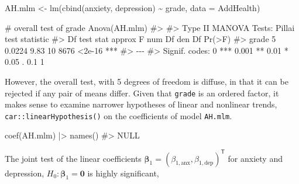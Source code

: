 \documentclass[
  letterpaper,
  10pt,
  krantz2]{krantz}
\makeatletter
\newenvironment{Shaded}{\begin{snugshade}}{\end{snugshade}}
\newcommand{\AttributeTok}[1]{\textcolor[rgb]{0.40,0.45,0.13}{#1}}
\newcommand{\CommentTok}[1]{\textcolor[rgb]{0.37,0.37,0.37}{#1}}
\newcommand{\FunctionTok}[1]{\textcolor[rgb]{0.28,0.35,0.67}{#1}}
\newcommand{\NormalTok}[1]{\textcolor[rgb]{0.00,0.23,0.31}{#1}}
\newcommand{\OtherTok}[1]{\textcolor[rgb]{0.00,0.23,0.31}{#1}}
\newcommand{\SpecialCharTok}[1]{\textcolor[rgb]{0.37,0.37,0.37}{#1}}
\newenvironment{kframe}{%
  \medskip{}
  \setlength{\fboxsep}{.8em}
  \def\at@end@of@kframe{}%
  \ifinner\ifhmode%
  \def\at@end@of@kframe{\end{minipage}}%
  \begin{minipage}{\columnwidth}%
  \fi\fi%
  \def\FrameCommand##1{\hskip\@totalleftmargin \hskip-\fboxsep
  \colorbox{shadecolor}{##1}\hskip-\fboxsep
      \hskip-\linewidth \hskip-\@totalleftmargin \hskip\columnwidth}%
  \MakeFramed {\advance\hsize-\width
    \@totalleftmargin\z@ \linewidth\hsize
    \@setminipage}}%
{\par\unskip\endMakeFramed%
  \at@end@of@kframe}
\renewenvironment{Shaded}{\begin{kframe}}{\end{kframe}}
\makeatother
\begin{document}
\begin{Shaded}
\begin{Highlighting}[]
\NormalTok{AH.mlm }\OtherTok{\textless{}{-}} \FunctionTok{lm}\NormalTok{(}\FunctionTok{cbind}\NormalTok{(anxiety, depression) }\SpecialCharTok{\textasciitilde{}}\NormalTok{ grade, }\AttributeTok{data =}\NormalTok{ AddHealth)}

\CommentTok{\# overall test of \textasciigrave{}grade\textasciigrave{}}
\FunctionTok{Anova}\NormalTok{(AH.mlm)}
\CommentTok{\#\textgreater{} }
\CommentTok{\#\textgreater{} Type II MANOVA Tests: Pillai test statistic}
\CommentTok{\#\textgreater{}       Df test stat approx F num Df den Df Pr(\textgreater{}F)    }
\CommentTok{\#\textgreater{} grade  5    0.0224     9.83     10   8676 \textless{}2e{-}16 ***}
\CommentTok{\#\textgreater{} {-}{-}{-}}
\CommentTok{\#\textgreater{} Signif. codes:  0 \textquotesingle{}***\textquotesingle{} 0.001 \textquotesingle{}**\textquotesingle{} 0.01 \textquotesingle{}*\textquotesingle{} 0.05 \textquotesingle{}.\textquotesingle{} 0.1 \textquotesingle{} \textquotesingle{} 1}
\end{Highlighting}
\end{Shaded}

However, the overall test, with 5 degrees of freedom is diffuse, in that
it can be rejected if any pair of means differ. Given that
\texttt{grade} is an ordered factor, it makes sense to examine narrower
hypotheses of linear and nonlinear trends,
\texttt{car::linearHypothesis()} on the coefficients of model
\texttt{AH.mlm}.

\begin{Shaded}
\begin{Highlighting}[]
\FunctionTok{coef}\NormalTok{(AH.mlm) }\SpecialCharTok{|\textgreater{}} \FunctionTok{names}\NormalTok{()}
\CommentTok{\#\textgreater{} NULL}
\end{Highlighting}
\end{Shaded}

The joint test of the linear coefficients
\(\boldsymbol{\beta}_1 = (\beta_{1,\text{anx}},  \beta_{1,\text{dep}})^\mathsf{T}\)
for anxiety and depression,
\(H_0 : \boldsymbol{\beta}_1 = \boldsymbol{0}\) is highly significant,
\end{document}
